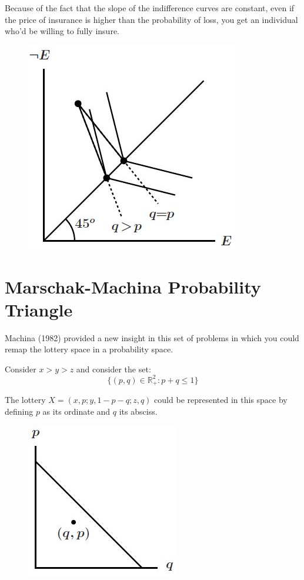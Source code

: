 \documentclass[12pt]{report}
\begin{document}
Because of the fact that the slope of the indifference curves are constant, even if the price of insurance is higher than the probability of loss, you get an individual who'd be willing to fully insure.
\begin{figure}[ht!]
\centering
\includegraphics[scale=0.6]{images/rdprobfi}
\end{figure}

\section{Marschak-Machina Probability Triangle}

Machina (1982) provided a new insight in this set of problems in which you could remap the lottery space in a probability space.

Consider $x>y>z$ and consider the set:$$\{(p,q)\in\mathbb{R}_+^2 : p+q\leq 1\} $$

The lottery $X = (x, p; y, 1-p-q; z, q)$ could be represented in this space by defining $p$ as its ordinate and $q$ its absciss.
\begin{figure}[ht!]
\centering
\includegraphics[scale=0.7]{images/machinatri}
\end{figure}
\end{document}

